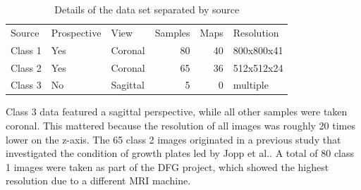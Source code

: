 \begin{table}[h!]
\centering
\begin{tabular}{ | l | l | l | r | r | l |}
  \hline
  Source & Prospective & View & Samples & Maps & Resolution \\
  \Xhline{3\arrayrulewidth}
  Class 1 & Yes        & Coronal     & 80      & 40            & 800x800x41 \\
  \hline
  Class 2 & Yes        & Coronal     & 65      & 36            & 512x512x24 \\
  \hline
  Class 3 & No         & Sagittal    & 5       & 0             & multiple \\
  \hline
\end{tabular}
\caption{Details of the data set separated by source}
\end{table}

Class 3 data featured a sagittal perspective, while all other samples were taken coronal. This mattered because the resolution of all images was roughly 20 times lower on the z-axis. The 65 class 2 images originated in a previous study that investigated the condition of growth plates led by Jopp et al.. A total of 80 class 1 images were taken as part of the DFG project, which showed the highest resolution due to a different MRI machine.

